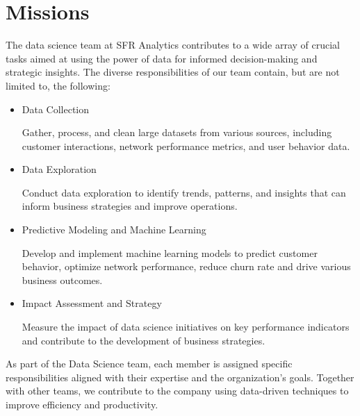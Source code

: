 \chapter{Missions}

\startcontents[chapters]

The data science team at SFR Analytics contributes to a wide array of crucial tasks aimed at using the power of data for informed decision-making and strategic insights. The diverse responsibilities of our team contain, but are not limited to, the following:

\begin{itemize}
    \item Data Collection

    Gather, process, and clean large datasets from various sources, including customer interactions, network performance metrics, and user behavior data.
    
    \item Data Exploration

    Conduct data exploration to identify trends, patterns, and insights that can inform business strategies and improve operations.
    
    \item Predictive Modeling and Machine Learning

    Develop and implement machine learning models to predict customer behavior, optimize network performance, reduce churn rate and drive various business outcomes.
    
    \item Impact Assessment and Strategy

    Measure the impact of data science initiatives on key performance indicators and contribute to the development of business strategies.
\end{itemize}

As part of the Data Science team, each member is assigned specific responsibilities aligned with their expertise and the organization's goals. Together with other teams, we contribute to the company using data-driven techniques to improve efficiency and productivity.

